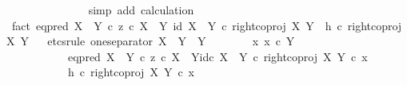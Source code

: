 \begin{isabellebody}
\ \ \ \ \ \ \ \ \ \ \ \ \ \isamarkupfalse%
\ {\isacharparenleft}{\kern0pt}simp\ add{\isacharcolon}{\kern0pt}\ calculation{\isacharparenright}{\kern0pt}\isanewline
\ \ \ \ \isamarkupfalse%
\isanewline
\ \ \isamarkupfalse%
\isanewline
\isanewline
\ \ \isamarkupfalse%
\ fact{}{\isacharcolon}{\kern0pt}\ {\isachardoublequoteopen}{\isacharparenleft}{\kern0pt}eq{\isacharunderscore}{\kern0pt}pred\ {\isacharparenleft}{\kern0pt}X\ {\isasymCoprod}\ Y{\isacharparenright}{\kern0pt}\ {\isasymcirc}\isactrlsub c\ {\isasymlangle}z\ {\isasymcirc}\isactrlsub c\ {\isasymbeta}\isactrlbsub X\ {\isasymCoprod}\ Y\isactrlesub {\isacharcomma}{\kern0pt}\ id\ {\isacharparenleft}{\kern0pt}X\ {\isasymCoprod}\ Y{\isacharparenright}{\kern0pt}{\isasymrangle}{\isacharparenright}{\kern0pt}\ {\isasymcirc}\isactrlsub c\ right{\isacharunderscore}{\kern0pt}coproj\ X\ Y\ {\isacharequal}{\kern0pt}\ h\ {\isasymcirc}\isactrlsub c\ right{\isacharunderscore}{\kern0pt}coproj\ X\ Y{\isachardoublequoteclose}\isanewline
\ \ \isamarkupfalse%
{\isacharparenleft}{\kern0pt}etcs{\isacharunderscore}{\kern0pt}rule\ one{\isacharunderscore}{\kern0pt}separator{\isacharbrackleft}{\kern0pt}\ X\ {\isacharequal}{\kern0pt}\ Y{\isacharcomma}{\kern0pt}\ \ Y\ {\isacharequal}{\kern0pt}\ {\isasymOmega}{\isacharbrackright}{\kern0pt}{\isacharparenright}{\kern0pt}\isanewline
\ \ \ \ \isamarkupfalse%
\ {\isachardoublequoteopen}{\isasymAnd}x{\isachardot}{\kern0pt}\ x\ {\isasymin}\isactrlsub c\ Y\ {\isasymLongrightarrow}\isanewline
\ \ \ \ \ \ \ \ \ \ \ {\isacharparenleft}{\kern0pt}{\isacharparenleft}{\kern0pt}eq{\isacharunderscore}{\kern0pt}pred\ {\isacharparenleft}{\kern0pt}X\ {\isasymCoprod}\ Y{\isacharparenright}{\kern0pt}\ {\isasymcirc}\isactrlsub c\ {\isasymlangle}z\ {\isasymcirc}\isactrlsub c\ {\isasymbeta}\isactrlbsub X\ {\isasymCoprod}\ Y\isactrlesub {\isacharcomma}{\kern0pt}id\isactrlsub c\ {\isacharparenleft}{\kern0pt}X\ {\isasymCoprod}\ Y{\isacharparenright}{\kern0pt}{\isasymrangle}{\isacharparenright}{\kern0pt}\ {\isasymcirc}\isactrlsub c\ right{\isacharunderscore}{\kern0pt}coproj\ X\ Y{\isacharparenright}{\kern0pt}\ {\isasymcirc}\isactrlsub c\ x\ {\isacharequal}{\kern0pt}\isanewline
\ \ \ \ \ \ \ \ \ \ \ {\isacharparenleft}{\kern0pt}h\ {\isasymcirc}\isactrlsub c\ right{\isacharunderscore}{\kern0pt}coproj\ X\ Y{\isacharparenright}{\kern0pt}\ {\isasymcirc}\isactrlsub c\ x{\isachardoublequoteclose}\isanewline
\ \ \ \ \isamarkupfalse%
\ {\isacharminus}{\kern0pt}\ \isanewline

\end{isabellebody}
